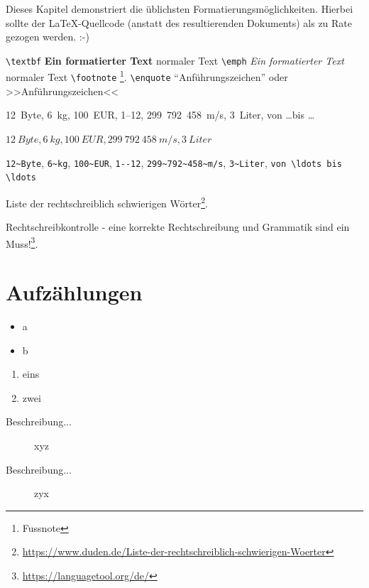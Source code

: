 
Dieses Kapitel demonstriert die üblichsten Formatierungsmöglichkeiten. Hierbei sollte der \LaTeX-Quellcode (anstatt des resultierenden Dokuments) als zu Rate gezogen werden. :-)


\verb|\textbf| \textbf{Ein formatierter Text} normaler Text \verb|\emph|  \emph{Ein formatierter Text} normaler Text \verb|\footnote| \footnote{Fussnote}. \verb|\enquote| \enquote{Anführungszeichen} oder >>Anführungszeichen<<

12~Byte, 6~kg, 100~EUR, 1--12, 299~792~458~m/s, 3~Liter, von \ldots bis \ldots

$12~Byte, 6~kg, 100~EUR, 299~792~458~m/s, 3~Liter$

\verb|12~Byte|, \verb|6~kg|, \verb|100~EUR|, \verb|1--12|, \verb|299~792~458~m/s|, \verb|3~Liter|, \verb|von \ldots bis \ldots|

Liste der recht­schreib­lich schwieri­gen Wörter\footnote{\url{https://www.duden.de/Liste-der-rechtschreiblich-schwierigen-Woerter}}.

Rechtschreibkontrolle - eine korrekte Rechtschreibung und Grammatik sind ein Muss!\footnote{\url{https://languagetool.org/de/}}.



\section{Aufzählungen}

\begin{itemize}
	\item a
	\item b
\end{itemize}

\begin{enumerate}
	\item eins 
	\item zwei
\end{enumerate}


\begin{description}
	\item[Beschreibung...] xyz 
	\item[Beschreibung...] zyx
\end{description}


